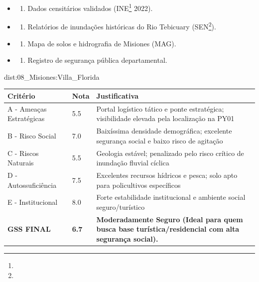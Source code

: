 {\begin{itemize}
\tightlist
\item
  \begin{enumerate}
  \def\labelenumi{\arabic{enumi})}
  \tightlist
  \item
    Dados censitários validados (INE\footnote{\fineINE} 2022).
  \end{enumerate}
\item
  \begin{enumerate}
  \def\labelenumi{\arabic{enumi})}
  \setcounter{enumi}{1}
  \tightlist
  \item
    Relatórios de inundações históricas do Rio Tebicuary (SEN\footnote{\fineSEN}).
  \end{enumerate}
\item
  \begin{enumerate}
  \def\labelenumi{\arabic{enumi})}
  \setcounter{enumi}{2}
  \tightlist
  \item
    Mapa de solos e hidrografia de Misiones (MAG).
  \end{enumerate}
\item
  \begin{enumerate}
  \def\labelenumi{\arabic{enumi})}
  \setcounter{enumi}{3}
  \tightlist
  \item
    Registro de segurança pública departamental.
  \end{enumerate}
\end{itemize}}{dist:08_Misiones:Villa_Florida}
\begin{table}[ht!]
\small \begin{tabular}{p{3.0cm}p{0.8cm}p{6.0cm}} \toprule
\textbf{Critério} & \textbf{Nota} & \textbf{Justificativa} \\ \midrule
A - Ameaças Estratégicas & 5.5 & Portal logístico tático e ponte estratégica; visibilidade elevada pela localização na PY01 \\
B - Risco Social & 7.0 & Baixíssima densidade demográfica; excelente segurança social e baixo risco de agitação \\
C - Riscos Naturais & 5.5 & Geologia estável; penalizado pelo risco crítico de inundação fluvial cíclica \\
D - Autossuficiência & 7.5 & Excelentes recursos hídricos e pesca; solo apto para policultivos específicos \\
E - Institucional & 8.0 & Forte estabilidade institucional e ambiente social seguro/\allowbreak turístico \\
\midrule \textbf{GSS FINAL} & \textbf{6.7} & \textbf{Moderadamente Seguro (Ideal para quem busca base turística/\allowbreak residencial com alta segurança social).} \\ \bottomrule \end{tabular}
\end{table}
